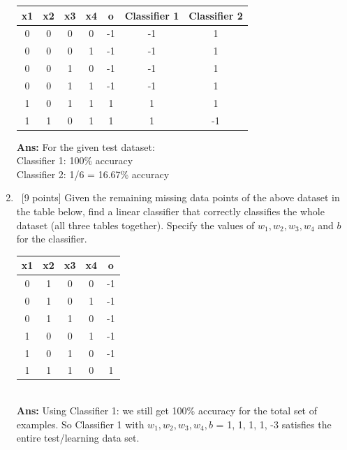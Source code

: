 \documentclass[12pt, fullpage,letterpaper]{article}
\begin{document}
\begin{enumerate}
        \begin{table}[h]
        \centering
        \begin{tabular}{cccc|c|c|c}
            x1 & x2 & x3 & x4 & o & Classifier 1 & Classifier 2 \\ \hline
            0  & 0  & 0  & 0  & -1&  -1& 1\\
            0  & 0  & 0  & 1  & -1&  -1& 1\\
            0  & 0  & 1  & 0  & -1&  -1& 1\\
            0  & 0  & 1  & 1  & -1&  -1& 1\\
            1  & 0  & 1  & 1  &  1&   1& 1\\
            1  & 1  & 0  & 1  &  1&   1&-1\\
        \end{tabular}
        \end{table}
\textbf{Ans: }For the given test dataset:\\
Classifier 1: 100\% accuracy\\
Classifier 2: 1/6 = 16.67\% accuracy\\
    \item~[9 points] Given the remaining missing data points of the above dataset in the table below, find a linear classifier that correctly classifies the whole dataset (all three tables together). Specify the values of $w_1, w_2, w_3, w_4$ and $b$ for the classifier.
        \begin{table}[h]
        \centering
        \begin{tabular}{cccc|c}
            x1 & x2 & x3 & x4 & o  \\ \hline
            0  & 1  & 0  & 0  & -1  \\
            0  & 1  & 0  & 1  & -1  \\
            0  & 1  & 1  & 0  & -1  \\
            1  & 0  & 0  & 1  & -1  \\
            1  & 0  & 1  & 0  & -1  \\
            1  & 1  & 1  & 0  &  1  \\
            \end{tabular}
        \end{table}
	\\\textbf{Ans: }Using Classifier 1: we still get 100\% accuracy for the total set of examples. So Classifier 1 with $w_1, w_2, w_3, w_4, b$ = {1, 1, 1, 1, -3} satisfies the entire test/learning data set.
\end{enumerate}
\end{document}

